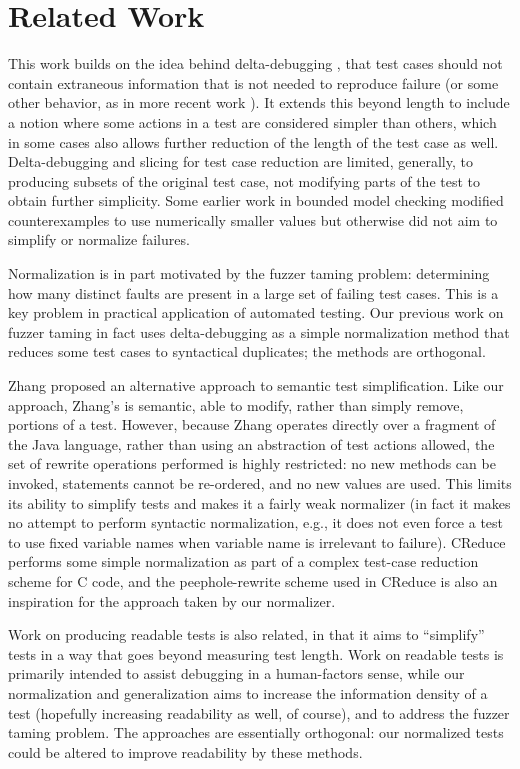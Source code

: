 \section{Related Work}

This work builds on the idea behind delta-debugging \cite{DD}, that test cases
should not contain extraneous information that is not needed to
reproduce failure (or some other behavior, as in more recent work \cite{icst2014,stvrcausereduce}).  It extends this beyond length to include a notion
where some actions in a test are considered simpler than others, which
in some cases also allows further reduction of the length of the test
case as well.  Delta-debugging and slicing \cite{TCminim} for test case
reduction are limited, generally, to producing subsets of the original
test case, not modifying parts of the test to obtain further
simplicity.  Some earlier work in bounded model checking modified
counterexamples to use numerically smaller values \cite{MakeMost} but
otherwise did not aim to simplify or normalize failures.

Normalization is in part motivated by the fuzzer taming \cite{PLDI13}
problem:  determining how many distinct faults are present in a large
set of failing test cases.  This is a key problem in practical
application of automated testing.  Our previous work on fuzzer taming
in fact uses delta-debugging as a simple normalization method that
reduces some test cases to syntactical duplicates; the methods are orthogonal.

Zhang \cite{SaiSimple} proposed an alternative approach to semantic
test simplification.  Like our approach, Zhang's is semantic, able to
modify, rather than simply remove, portions of a test.  However,
because Zhang operates directly over a fragment of the Java language,
rather than using an abstraction of test actions allowed, the set of
rewrite operations performed is highly restricted:  no new methods can
be invoked, statements cannot be re-ordered, and no new values are
used.  This limits its ability to simplify tests and makes it a fairly
weak normalizer (in fact it makes no attempt to perform syntactic
normalization, e.g., it does not even force a test to use fixed
variable names when variable name is irrelevant to failure).
CReduce \cite{CReduce} performs some simple normalization as part of a
complex test-case reduction scheme for C code, and the
peephole-rewrite scheme used in CReduce is also an inspiration for the
approach taken by our normalizer.

Work on producing readable tests \cite{Guava,Readable} is also
related, in that it aims to ``simplify'' tests in a way that goes
beyond measuring test length.  Work on readable tests is primarily
intended to assist debugging in a human-factors sense, while our
normalization and generalization aims to increase the information
density of a test (hopefully increasing readability as well, of
course), and to address the fuzzer taming problem.  The approaches are
essentially orthogonal: our normalized tests could be altered to
improve readability by these methods.

